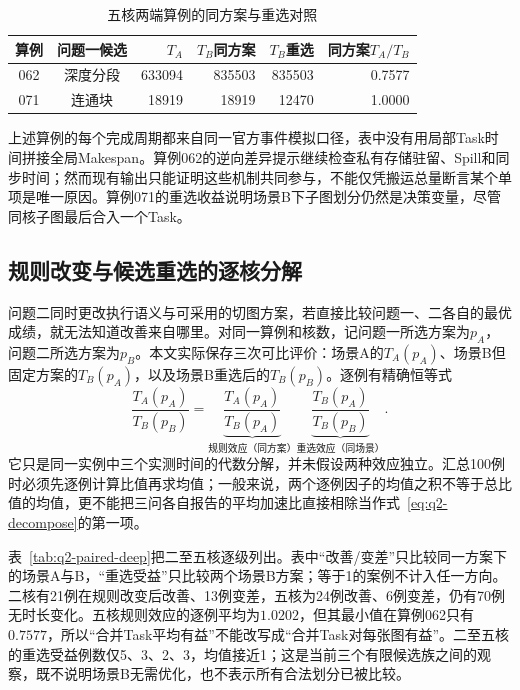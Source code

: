\begin{table}[htbp]\centering
\caption{五核两端算例的同方案与重选对照}\label{tab:q2-paired-cases}
\small
\begin{tabular}{c c r r r r}
\toprule
算例 & 问题一候选 & $T_A$ & $T_B$同方案 & $T_B$重选 & 同方案$T_A/T_B$ \\
\midrule
062 & 深度分段 & 633094 & 835503 & 835503 & 0.7577 \\
071 & 连通块 & 18919 & 18919 & 12470 & 1.0000 \\
\bottomrule
\end{tabular}
\end{table}

上述算例的每个完成周期都来自同一官方事件模拟口径，表中没有用局部Task时间拼接全局Makespan。算例062的逆向差异提示继续检查私有存储驻留、Spill和同步时间；然而现有输出只能证明这些机制共同参与，不能仅凭搬运总量断言某个单项是唯一原因。算例071的重选收益说明场景B下子图划分仍然是决策变量，尽管同核子图最后合入一个Task。



\subsection{规则改变与候选重选的逐核分解}

问题二同时更改执行语义与可采用的切图方案，若直接比较问题一、二各自的最优成绩，就无法知道改善来自哪里。对同一算例和核数，记问题一所选方案为$p_A$，问题二所选方案为$p_B$。本文实际保存三次可比评价：场景A的$T_A(p_A)$、场景B但固定方案的$T_B(p_A)$，以及场景B重选后的$T_B(p_B)$。逐例有精确恒等式
\begin{equation}\label{eq:q2-decompose}
\frac{T_A(p_A)}{T_B(p_B)}=
\underbrace{\frac{T_A(p_A)}{T_B(p_A)}}_{\text{规则效应（同方案）}}
\underbrace{\frac{T_B(p_A)}{T_B(p_B)}}_{\text{重选效应（同场景）}}.
\end{equation}
它只是同一实例中三个实测时间的代数分解，并未假设两种效应独立。汇总100例时必须先逐例计算比值再求均值；一般来说，两个逐例因子的均值之积不等于总比值的均值，更不能把三问各自报告的平均加速比直接相除当作式~\eqref{eq:q2-decompose}的第一项。

表~\ref{tab:q2-paired-deep}把二至五核逐级列出。表中“改善/变差”只比较同一方案下的场景A与B，“重选受益”只比较两个场景B方案；等于1的案例不计入任一方向。二核有21例在规则改变后改善、13例变差，五核为24例改善、6例变差，仍有70例无时长变化。五核规则效应的逐例平均为$1.0202$，但其最小值在算例062只有$0.7577$，所以“合并Task平均有益”不能改写成“合并Task对每张图有益”。二至五核的重选受益例数仅5、3、2、3，均值接近1；这是当前三个有限候选族之间的观察，既不说明场景B无需优化，也不表示所有合法划分已被比较。

